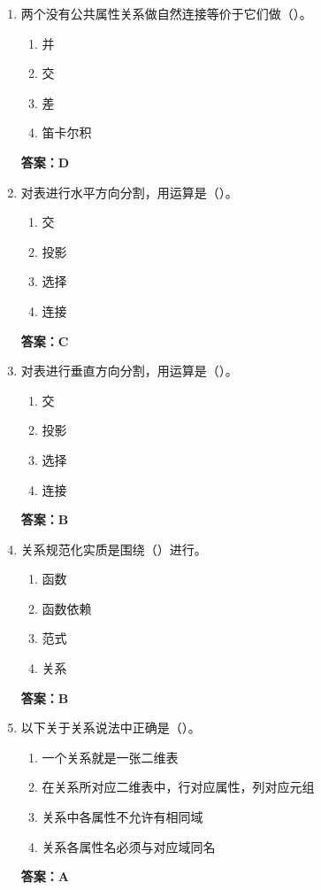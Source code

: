 \documentclass[12pt, a4paper]{article}
\begin{document}
\begin{enumerate}[label=\arabic*.]
    \item 两个没有公共属性关系做自然连接等价于它们做（\quad）。
    \begin{enumerate}
        \item 并
        \item 交
        \item 差
        \item 笛卡尔积
    \end{enumerate}
    \textbf{答案：D}

    \item 对表进行水平方向分割，用运算是（\quad）。
    \begin{enumerate}
        \item 交
        \item 投影
        \item 选择
        \item 连接
    \end{enumerate}
    \textbf{答案：C}

    \item 对表进行垂直方向分割，用运算是（\quad）。
    \begin{enumerate}
        \item 交
        \item 投影
        \item 选择
        \item 连接
    \end{enumerate}
    \textbf{答案：B}

    \item 关系规范化实质是围绕（\quad）进行。
    \begin{enumerate}
        \item 函数
        \item 函数依赖
        \item 范式
        \item 关系
    \end{enumerate}
    \textbf{答案：B}

    \item 以下关于关系说法中正确是（\quad）。
    \begin{enumerate}
        \item 一个关系就是一张二维表
        \item 在关系所对应二维表中，行对应属性，列对应元组
        \item 关系中各属性不允许有相同域
        \item 关系各属性名必须与对应域同名
    \end{enumerate}
    \textbf{答案：A}


\end{enumerate}
\end{document}
